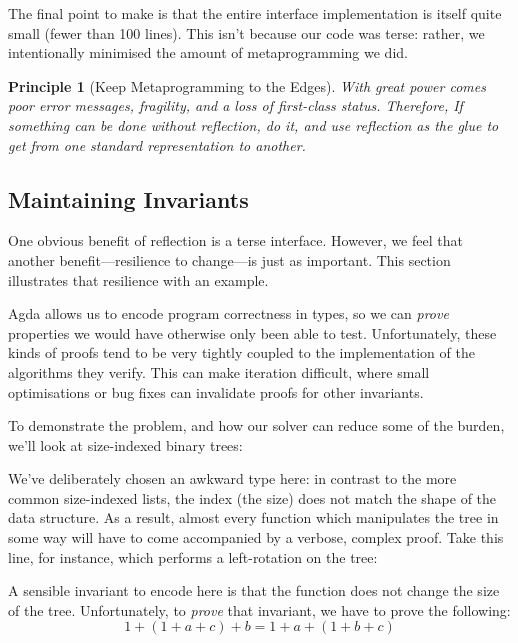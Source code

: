 \documentclass[12pt]{article}
\newtheorem{principle}{Principle}
\begin{document}
The final point to make is that the entire interface implementation is itself
quite small (fewer than 100 lines). This isn't because our code was terse:
rather, we intentionally minimised the amount of metaprogramming we did.

\begin{principle}[Keep Metaprogramming to the Edges] With great power comes poor
  error messages, fragility, and a loss of first-class status. Therefore, If
  something can be done without reflection, \emph{do it}, and use reflection as
  the glue to get from one standard representation to another.
\end{principle}
\subsection{Maintaining Invariants}
One obvious benefit of reflection is a terse interface. However, we feel that
another benefit---resilience to change---is just as important. This section
illustrates that resilience with an example.

Agda allows us to encode program correctness in types, so we can \emph{prove}
properties we would have otherwise only been able to test. Unfortunately, these
kinds of proofs tend to be very tightly coupled to the implementation of the
algorithms they verify. This can make iteration difficult, where small
optimisations or bug fixes can invalidate proofs for other invariants.

To demonstrate the problem, and how our solver can reduce some of the burden,
we'll look at size-indexed binary trees:
\begin{center}
\end{center}

We've deliberately chosen an awkward type here: in contrast to the more common
size-indexed lists, the index (the size) does not match the shape of the data
structure. As a result, almost every function which manipulates the tree in some
way will have to come accompanied by a verbose, complex proof. Take this line,
for instance, which performs a left-rotation on the tree:
\begin{center}
\end{center}

A sensible invariant to encode here is that the function does not change the size
of the tree. Unfortunately, to \emph{prove} that invariant, we have to prove the
following:
\[1 + (1 + a + c) + b = 1 + a + (1 + b + c)\]
\end{document}
